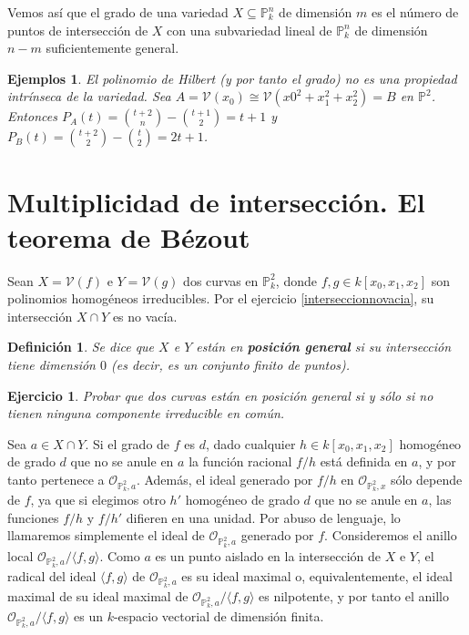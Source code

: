 \documentclass[a4paper,10pt]{book}
\newtheorem{defn}[thm]{Definición}
\newtheorem{eje}[thm]{Ejemplos}
\newtheorem{ejercicio}{Ejercicio}[chapter]
\newcommand{\PP}{\mathbb P}
\newcommand{\Pnk}{\PP^n_k}
\newcommand{\VV}{{\mathcal V}}
\begin{document}
Vemos así que el grado de una variedad $X\subseteq\Pnk$ de dimensión $m$ es el número de puntos de intersección de $X$ con una subvariedad lineal de $\Pnk$ de dimensión $n-m$ suficientemente general. 

\begin{eje}
El polinomio de Hilbert (y por tanto el grado) no es una propiedad intrínseca de la variedad. Sea $A=\VV(x_0)\cong \VV(x0^2+x_1^2+x_2^2)=B$ en $\mathbb{P}^2$. Entonces $P_A(t)=\binom{t+2}{n}-\binom{t+1}{2}=t+1$ y $P_B(t)=\binom{t+2}{2}-\binom{t}{2}=2t+1$. 
\end{eje}

\section[Multiplicidad de intersección]{Multiplicidad de intersección. El teorema de Bézout}

                                                                                                                                                                                                                                                                                                                                                                                        Sean $X=\VV(f)$ e $Y=\VV(g)$ dos curvas en $\PP^2_k$, donde $f,g\in k[x_0,x_1,x_2]$ son polinomios homogéneos irreducibles. Por el ejercicio \ref{interseccionnovacia}, su intersección $X\cap Y$ es no vacía. 

\begin{defn}
 Se dice que $X$ e $Y$ están en {\bf posición general} si su intersección tiene dimensión $0$ (es decir, es un conjunto finito de puntos).
\end{defn}

\begin{ejercicio}
 Probar que dos curvas están en posición general si y sólo si no tienen ninguna componente irreducible en común.
\end{ejercicio}

Sea $a\in X\cap Y$. Si el grado de $f$ es $d$, dado cualquier $h\in k[x_0,x_1,x_2]$ homogéneo de grado $d$ que no se anule en $a$ la función racional $f/h$ está definida en $a$, y por tanto pertenece a ${\mathcal O}_{\PP^2_k,a}$. Además, el ideal generado por $f/h$ en ${\mathcal O}_{\PP^2_k,x}$ sólo depende de $f$, ya que si elegimos otro $h'$ homogéneo de grado $d$ que no se anule en $a$, las funciones ${f}/{h}$ y ${f}/{h'}$ difieren en una unidad. Por abuso de lenguaje, lo llamaremos simplemente el ideal de ${\mathcal O}_{\PP^2_k,a}$ generado por $f$. Consideremos el anillo local ${\mathcal O}_{\PP^2_k,a}/\langle f,g\rangle$. Como $a$ es un punto aislado en la intersección de $X$ e $Y$, el radical del ideal $\langle f,g\rangle$ de ${\mathcal O}_{\PP^2_k,a}$ es su ideal maximal o, equivalentemente, el ideal maximal de  su ideal maximal de ${\mathcal O}_{\PP^2_k,a}/\langle f,g\rangle$ es nilpotente, y por tanto el anillo ${\mathcal O}_{\PP^2_k,a}/\langle f,g\rangle$ es un $k$-espacio vectorial de dimensión finita. 
\end{document}
